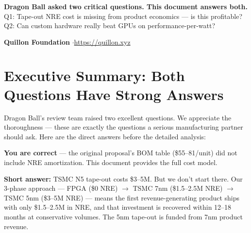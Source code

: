 \documentclass[11pt,a4paper]{article}
\begin{document}
\begin{center}
\vspace{2cm}

\begin{tcolorbox}[
    enhanced, colback=qnkpurple!5, colframe=qnkpurple!50,
    boxrule=0.5pt, arc=8pt, width=13cm, center, fontupper=\centering
]
{\small\textcolor{qnkslate}{
\textbf{Dragon Ball asked two critical questions. This document answers both.}\\[6pt]
Q1: Tape-out NRE cost is missing from product economics --- is this profitable?\\[4pt]
Q2: Can custom hardware really beat GPUs on performance-per-watt?
}}
\end{tcolorbox}

\vfill

{\small\textcolor{qnkslate}{
\textbf{Quillon Foundation} \quad$\cdot$\quad \url{https://quillon.xyz}
}}

\end{center}
\newpage

\tableofcontents
\newpage


\section{Executive Summary: Both Questions Have Strong Answers}

Dragon Ball's review team raised two excellent questions. We appreciate the thoroughness --- these are exactly the questions a serious manufacturing partner should ask. Here are the direct answers before the detailed analysis:

\begin{answerbox}
\textbf{You are correct} --- the original proposal's BOM table (\$55--81/unit) did not include NRE amortization. This document provides the full cost model.

\textbf{Short answer:} TSMC N5 tape-out costs \$3--5M. But we don't start there. Our 3-phase approach --- FPGA (\$0 NRE) $\to$ TSMC 7nm (\$1.5--2.5M NRE) $\to$ TSMC 5nm (\$3--5M NRE) --- means the first revenue-generating product ships with only \$1.5--2.5M in NRE, and that investment is recovered within 12--18 months at conservative volumes. The 5nm tape-out is funded from 7nm product revenue.
\end{answerbox}
\end{document}
